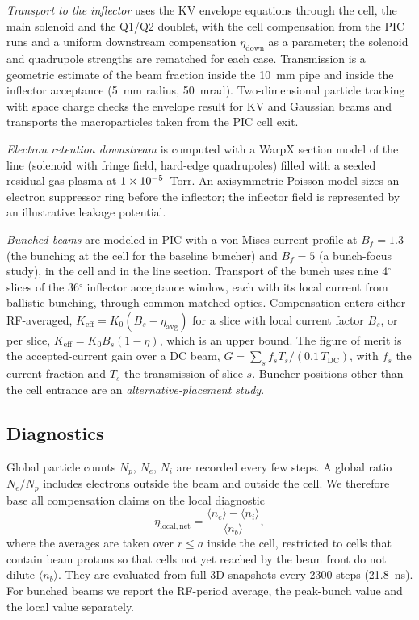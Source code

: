 \documentclass[aps,prab,10pt,twocolumn,superscriptaddress,showpacs,floatfix]{revtex4-2}
\newcommand{\Keff}{K_{\mathrm{eff}}}
\newcommand{\etaavg}{\eta_{\mathrm{avg}}}
\begin{document}
\emph{Transport to the inflector} uses the KV envelope equations through the cell, the
main solenoid and the Q1/Q2 doublet, with the cell compensation from the PIC runs and a
uniform downstream compensation $\eta_{\mathrm{down}}$ as a parameter; the solenoid and
quadrupole strengths are rematched for each case. Transmission is a geometric estimate of the
beam fraction inside the 10~mm pipe and inside the inflector acceptance (5~mm radius,
50~mrad). Two-dimensional particle tracking
with space charge checks the envelope result for KV and Gaussian beams and transports the
macroparticles taken from the PIC cell exit.

\emph{Electron retention downstream} is computed with a WarpX section model of the line
(solenoid with fringe field, hard-edge quadrupoles) filled with a seeded residual-gas plasma
at $1\times10^{-5}$~Torr. An axisymmetric Poisson model sizes an electron suppressor ring before
the inflector; the inflector field is represented by an illustrative leakage potential.

\emph{Bunched beams} are modeled in PIC with a von Mises current profile at $B_f=1.3$ (the
bunching at the cell for the baseline buncher) and $B_f=5$ (a bunch-focus study), in the cell
and in the line section. Transport of the bunch uses nine 4$^\circ$ slices of the
36$^\circ$ inflector acceptance window, each with its local current from ballistic bunching,
through common matched optics. Compensation enters either RF-averaged,
$\Keff=K_0(B_s-\etaavg)$ for a slice with local current factor $B_s$, or per slice,
$\Keff=K_0B_s(1-\eta)$, which is an upper bound. The figure of merit is the accepted-current
gain over a DC beam, $G=\sum_s f_sT_s/(0.1\,T_{\mathrm{DC}})$, with $f_s$ the current
fraction and $T_s$ the transmission of slice $s$. Buncher positions other than the cell
entrance are an \emph{alternative-placement study}.

\subsection{Diagnostics}

Global particle counts $N_p$, $N_e$, $N_i$ are recorded every few steps. A global
ratio $N_e/N_p$ includes electrons outside the beam and outside the cell. We
therefore base all compensation claims on the local diagnostic
\begin{equation}
\eta_{\mathrm{local,net}}=\frac{\langle n_e\rangle-\langle n_i\rangle}{\langle n_b\rangle},
\end{equation}
where the averages are taken over $r\le a$ inside the cell, restricted to cells that
contain beam protons so that cells not yet reached by the beam front do not dilute
$\langle n_b\rangle$. They are evaluated from full 3D snapshots every 2300 steps
(21.8~ns). For bunched beams we report the RF-period average, the peak-bunch value and the
local value separately.
\end{document}
